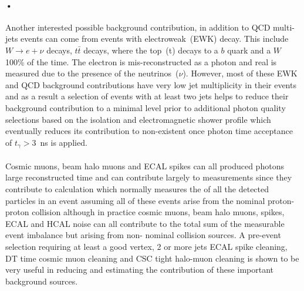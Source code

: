\paragraph*{•}
Another interested possible background contribution, in addition to QCD multi-jets events can come from events with electroweak~(EWK) decay. This include $W \rightarrow e + \nu$ decays, $t\bar{t}$ decays, where the top~(t) decays to a $b$ quark and a $W$ 100\% of the time. The electron is mis-reconstructed as a photon and real \MET is measured due to the presence of the neutrinos~($\nu$).  However, most of these EWK and QCD background contributions have very low jet multiplicity in their events and as a result a selection of events with at least two jets helps to reduce their background contribution to a minimal level prior to additional photon quality selections based on the isolation and electromagnetic shower profile which eventually reduces its contribution to non-existent once photon time acceptance of $t_{\gamma} > 3$~ns is applied.

\paragraph*{}
Cosmic muons, beam halo muons and ECAL spikes can all produced photons large reconstructed time and can contribute largely to \MET measurements since they contribute to \MET calculation which normally measures the \pt of all the detected particles in an event assuming all of these events arise from the nominal proton-proton collision although in practice cosmic muons, beam halo muons, spikes, ECAL and HCAL noise can all contribute to the total sum of the measurable event \pt imbalance but arising from non- nominal collision sources. 
A pre-event selection requiring at least a good vertex, 2 or more jets ECAL spike cleaning, DT time cosmic muon cleaning and CSC tight halo-muon cleaning is shown to be very useful in reducing and estimating the contribution of these important background sources.
